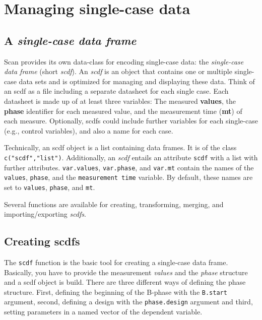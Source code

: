 \documentclass[
]{book}
\begin{document}
\hypertarget{managing-single-case-data}{%
\chapter{Managing single-case data}\label{managing-single-case-data}}

\hypertarget{a-single-case-data-frame}{%
\section{\texorpdfstring{A \textbf{\emph{single-case data frame}}}{A single-case data frame}}\label{a-single-case-data-frame}}

Scan provides its own data-class for encoding single-case data: the \emph{single-case data frame} (short \emph{scdf}). An \emph{scdf} is an object that contains one or multiple single-case data sets and is optimized for managing and displaying these data. Think of an scdf as a file including a separate datasheet for each single case. Each datasheet is made up of at least three variables: The measured \textbf{values}, the \textbf{phase} identifier for each measured value, and the measurement time (\textbf{mt}) of each measure. Optionally, scdfs could include further variables for each single-case (e.g., control variables), and also a name for each case.

\begin{rmdnote}
Technically, an scdf object is a list containing data frames. It is of
the class \texttt{c("scdf","list")}. Additionally, an \emph{scdf}
entails an attribute \texttt{scdf} with a list with further attributes.
\texttt{var.values}, \texttt{var.phase}, and \texttt{var.mt} contain the
names of the \texttt{values}, \texttt{phase}, and the
\texttt{measurement\ time} variable. By default, these names are set to
\texttt{values}, \texttt{phase}, and \texttt{mt}.
\end{rmdnote}

Several functions are available for creating, transforming, merging, and importing/exporting \emph{scdfs}.

\hypertarget{creating-scdfs}{%
\section{Creating scdfs}\label{creating-scdfs}}

The \texttt{scdf} function is the basic tool for creating a single-case data frame. Basically, you have to provide the measurement \emph{values} and the \emph{phase} structure and a scdf object is build. There are three different ways of defining the phase structure. First, defining the beginning of the B-phase with the \texttt{B.start} argument, second, defining a design with the \texttt{phase.design} argument and third, setting parameters in a named vector of the dependent variable.
\end{document}
